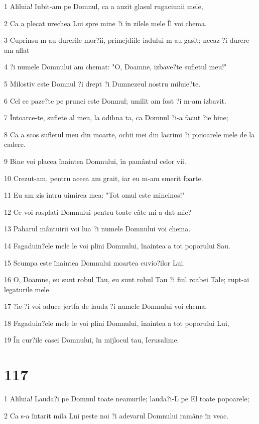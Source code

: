 \par 1 Aliluia! Iubit-am pe Domnul, ca a auzit glasul rugaciunii mele,
\par 2 Ca a plecat urechea Lui spre mine ?i în zilele mele Îl voi chema.
\par 3 Cuprinsu-m-au durerile mor?ii, primejdiile iadului m-au gasit; necaz ?i durere am aflat
\par 4 ?i numele Domnului am chemat: "O, Doamne, izbave?te sufletul meu!"
\par 5 Milostiv este Domnul ?i drept ?i Dumnezeul nostru miluie?te.
\par 6 Cel ce paze?te pe prunci este Domnul; umilit am fost ?i m-am izbavit.
\par 7 Întoarce-te, suflete al meu, la odihna ta, ca Domnul ?i-a facut ?ie bine;
\par 8 Ca a scos sufletul meu din moarte, ochii mei din lacrimi ?i picioarele mele de la cadere.
\par 9 Bine voi placea înaintea Domnului, în pamântul celor vii.
\par 10 Crezut-am, pentru aceea am grait, iar eu m-am smerit foarte.
\par 11 Eu am zis întru uimirea mea: "Tot omul este mincinos!"
\par 12 Ce voi rasplati Domnului pentru toate câte mi-a dat mie?
\par 13 Paharul mântuirii voi lua ?i numele Domnului voi chema.
\par 14 Fagaduin?ele mele le voi plini Domnului, înaintea a tot poporului Sau.
\par 15 Scumpa este înaintea Domnului moartea cuvio?ilor Lui.
\par 16 O, Doamne, eu sunt robul Tau, eu sunt robul Tau ?i fiul roabei Tale; rupt-ai legaturile mele.
\par 17 ?ie-?i voi aduce jertfa de lauda ?i numele Domnului voi chema.
\par 18 Fagaduin?ele mele le voi plini Domnului, înaintea a tot poporului Lui,
\par 19 În cur?ile casei Domnului, în mijlocul tau, Ierusalime.

\chapter{117}

\par 1 Aliluia! Lauda?i pe Domnul toate neamurile; lauda?i-L pe El toate popoarele;
\par 2 Ca s-a întarit mila Lui peste noi ?i adevarul Domnului ramâne în veac.

